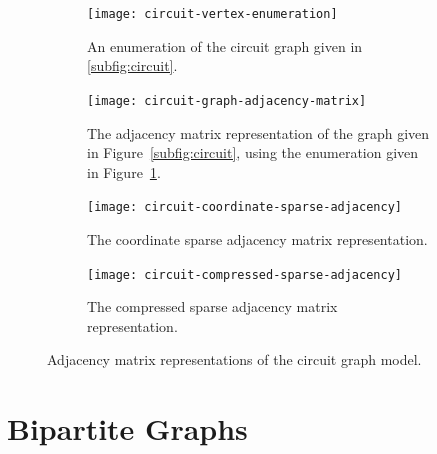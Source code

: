 \begin{figure}[tbh]
  \begin{subfigure}[t]{0.175\textwidth}
    \centering
    \texttt{[image: circuit-vertex-enumeration]}
    \caption{\label{fig:circuit-vertex-enumeration}
    An enumeration of the circuit graph given in \protect\ref{subfig:circuit}.}
  \end{subfigure}
  \hspace{1em}
  \begin{subfigure}[t]{0.25\textwidth}
    \centering
    \texttt{[image: circuit-graph-adjacency-matrix]}
    \caption{\label{fig:circuit-graph-adjacency-matrix}
    The adjacency matrix representation of the graph given in Figure~\protect\ref{subfig:circuit},
    using the enumeration given in Figure~\protect\ref{fig:circuit-vertex-enumeration}.}
  \end{subfigure}
  \hspace{1em}
  \begin{subfigure}[t]{0.175\textwidth}
    \small
    \centering
    \texttt{[image: circuit-coordinate-sparse-adjacency]}
    \caption{\label{fig:circuit-coordinate-sparse-adjacency}
    The coordinate sparse adjacency matrix representation.}
  \end{subfigure}
  \hspace{1em}
  \begin{subfigure}[t]{0.3\textwidth}
    \small
    \centering
    \texttt{[image: circuit-compressed-sparse-adjacency]}
    \caption{\label{fig:circuit-compressed-sparse-adjacency}
    The compressed sparse adjacency matrix representation.}
  \end{subfigure}
  \caption{Adjacency matrix representations of the circuit graph model.\label{fig:circuit-model}}
\end{figure}


\section{Bipartite Graphs}
\label{sec:bipartite}


